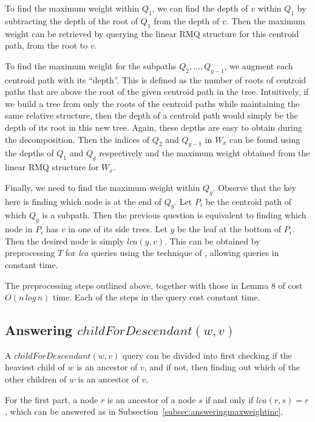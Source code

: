 \documentclass{article}
\begin{document}
    To find the maximum weight within $Q_1$, we can find the depth of $v$ within $Q_1$ by subtracting the depth of the root of $Q_1$ from the depth of $v$. Then the maximum weight can be retrieved by querying the linear RMQ structure for this centroid path, from the root to $v$.

    To find the maximum weight for the subpaths $Q_2, ..., Q_{g - 1}$, we augment each centroid path with its ``depth''. This is defined as the number of roots of centroid paths that are above the root of the given centroid path in the tree. Intuitively, if we build a tree from only the roots of the centroid paths while maintaining the same relative structure, then the depth of a centroid path would simply be the depth of its root in this new tree. Again, these depths are easy to obtain during the decomposition. Then the indices of $Q_2$ and $Q_{g-1}$ in $W_x$ can be found using the depths of $Q_1$ and $Q_g$ respectively and the maximum weight obtained from the linear RMQ structure for $W_x$.

    Finally, we need to find the maximum weight within $Q_g$. Observe that the key here is finding which node is at the end of $Q_g$. Let $P_i$ be the centroid path of which $Q_g$ is a subpath. Then the previous question is equivalent to finding which node in $P_i$ has $v$ in one of its side trees. Let $y$ be the leaf at the bottom of $P_i$. Then the desired node is simply $lca(y, v)$. This can be obtained by preprocessing $T$ for \textit{lca} queries using the technique of \cite{bender2000lca}, allowing queries in constant time.

    The preprocessing steps outlined above, together with those in Lemma 8 of \cite{jansson2018algorithms} cost $O(n\,log\,n)$ time. Each of the steps in the query cost constant time.

    \subsection{Answering $childForDescendant(w, v)$}
    \label{subsec:answeringcfd}

    A $childForDescendant(w, v)$ query can be divided into first checking if the heaviest child of $w$ is an ancestor of $v$, and if not, then finding out which of the other children of $w$ is an ancestor of $v$.

    For the first part, a node $r$ is an ancestor of a node $s$ if and only if $lca(r, s) = r$, which can be answered as in Subsection~\ref{subsec:answeringmaxweightinc}.
\end{document}
